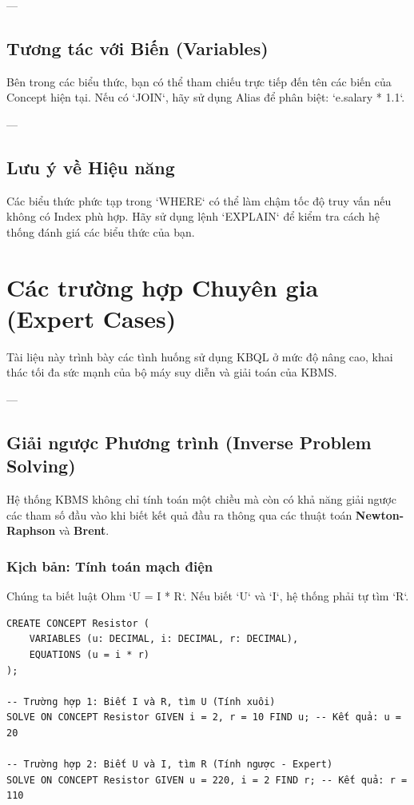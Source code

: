 ---

\subsection{Tương tác với Biến (Variables)}

Bên trong các biểu thức, bạn có thể tham chiếu trực tiếp đến tên các biến của Concept hiện tại. Nếu có `JOIN`, hãy sử dụng Alias để phân biệt: `e.salary * 1.1`.

---

\subsection{Lưu ý về Hiệu năng}

Các biểu thức phức tạp trong `WHERE` có thể làm chậm tốc độ truy vấn nếu không có Index phù hợp. Hãy sử dụng lệnh `EXPLAIN` để kiểm tra cách hệ thống đánh giá các biểu thức của bạn.

\section{Các trường hợp Chuyên gia (Expert Cases)}

Tài liệu này trình bày các tình huống sử dụng KBQL ở mức độ nâng cao, khai thác tối đa sức mạnh của bộ máy suy diễn và giải toán của KBMS.

---

\subsection{Giải ngược Phương trình (Inverse Problem Solving)}

Hệ thống KBMS không chỉ tính toán một chiều mà còn có khả năng giải ngược các tham số đầu vào khi biết kết quả đầu ra thông qua các thuật toán \textbf{Newton-Raphson} và \textbf{Brent}.

\subsubsection{Kịch bản: Tính toán mạch điện}
Chúng ta biết luật Ohm `U = I * R`. Nếu biết `U` và `I`, hệ thống phải tự tìm `R`.

\begin{verbatim}
CREATE CONCEPT Resistor (
    VARIABLES (u: DECIMAL, i: DECIMAL, r: DECIMAL),
    EQUATIONS (u = i * r)
);

-- Trường hợp 1: Biết I và R, tìm U (Tính xuôi)
SOLVE ON CONCEPT Resistor GIVEN i = 2, r = 10 FIND u; -- Kết quả: u = 20

-- Trường hợp 2: Biết U và I, tìm R (Tính ngược - Expert)
SOLVE ON CONCEPT Resistor GIVEN u = 220, i = 2 FIND r; -- Kết quả: r = 110
\end{verbatim}

